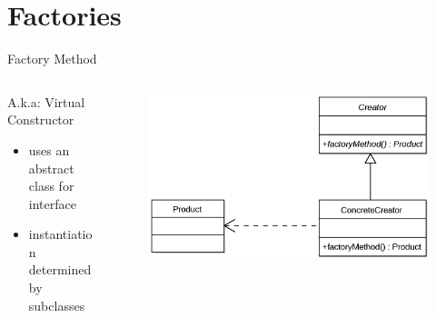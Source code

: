 \documentclass{beamer}
\begin{document}
\section{Factories}
\begin{frame}{Factory Method}
  \begin{columns}
    \begin{column}{.47\textwidth}
      \begin{block}{A.k.a: Virtual Constructor}
        \begin{itemize}
          \item uses an abstract class for interface
          \item instantiation determined by subclasses
        \end{itemize}
      \end{block}


    \end{column}

    \begin{column}{.47\textwidth}
      \begin{figure}[t]
        \includegraphics[width=.9\textwidth]{1000px-FactoryMethod.png}
      \end{figure}
    \end{column}
  \end{columns}

\end{frame}
\end{document}
